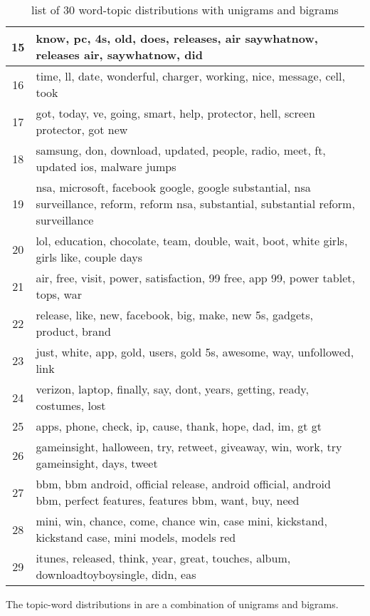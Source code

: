 \begin{table}
\begin{tabular}{c p{16cm}}
    15    & know, pc, 4s, old, does, releases, air saywhatnow, releases air, saywhatnow, did \\ \midrule
    16    & time, ll, date, wonderful, charger, working, nice, message, cell, took \\ \midrule
    17    & got, today, ve, going, smart, help, protector, hell, screen protector, got new \\ \midrule
    18    & samsung, don, download, updated, people, radio, meet, ft, updated ios, malware jumps \\ \midrule
    19    & nsa, microsoft, facebook google, google substantial, nsa surveillance, reform, reform nsa, substantial, substantial reform, surveillance \\ \midrule
    20    & lol, education, chocolate, team, double, wait, boot, white girls, girls like, couple days \\ \midrule
    21    & air, free, visit, power, satisfaction, 99 free, app 99, power tablet, tops, war \\ \midrule
    22    & release, like, new, facebook, big, make, new 5s, gadgets, product, brand \\ \midrule
    23    & just, white, app, gold, users, gold 5s, awesome, way, unfollowed, link \\ \midrule
    24    & verizon, laptop, finally, say, dont, years, getting, ready, costumes, lost \\ \midrule
    25    & apps, phone, check, ip, cause, thank, hope, dad, im, gt gt \\ \midrule
    26    & gameinsight, halloween, try, retweet, giveaway, win, work, try gameinsight, days, tweet \\ \midrule
    27    & bbm, bbm android, official release, android official, android bbm, perfect features, features bbm, want, buy, need \\ \midrule
    28    & mini, win, chance, come, chance win, case mini, kickstand, kickstand case, mini models, models red \\ \midrule
    29    & itunes, released, think, year, great, touches, album, downloadtoyboysingle, didn, eas \\ \bottomrule
  \end{tabular}
  \caption{list of 30 word-topic distributions with unigrams and bigrams}
  \label{tab:unigrams_bigrams_lda}
\end{table}

The topic-word distributions in  are a combination of unigrams
and bigrams.


